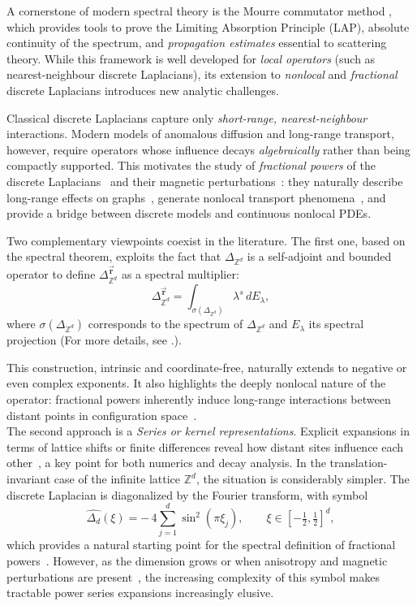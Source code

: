 \documentclass[10pt]{amsart} %
\newcommand{\1}{{\mathbb{I}}}
\numberwithin{equation}{section}
\begin{document}
A cornerstone of modern spectral theory is the Mourre commutator method \cite{GJ,GJ1,Mo81,Ge,ABG},
which provides tools to prove the Limiting Absorption Principle (LAP),
absolute continuity of the spectrum, and \emph{propagation estimates} essential to scattering theory.
While this framework is well developed for \emph{local operators}
(such as nearest-neighbour discrete Laplacians),
its extension to \emph{nonlocal} and \emph{fractional} discrete Laplacians
introduces new analytic challenges.

Classical discrete Laplacians capture only \emph{short-range, nearest-neighbour} interactions.
Modern models of anomalous diffusion and long-range transport, however,
require operators whose influence decays \emph{algebraically} rather than being compactly supported.
This motivates the study of \emph{fractional powers} of the discrete Laplacians~\cite{JKLQ,BDL,K2017,Or,Ortigueira2014Riesz} and their magnetic perturbations~\cite{Fan2021}:
they naturally describe long-range effects on graphs~\cite{TZ},
generate nonlocal transport phenomena~\cite{ScSo2012},
and provide a bridge between discrete models and continuous nonlocal PDEs.

Two complementary viewpoints coexist in the literature.
The first one, based on the spectral theorem, exploits the fact that $\Delta_{\mathbb{Z}^d}$ is a self-adjoint and bounded operator to define $\Delta^{\vec{\mathbf{r}}}_{\mathbb{Z}^d}$ as a spectral multiplier:
\[
\Delta^{\vec{\mathbf{r}}}_{\mathbb{Z}^d} = \int_{\sigma(\Delta_{\mathbb{Z}^d})} \lambda^s \, dE_\lambda,
\]
where $\sigma(\Delta_{\mathbb{Z}^d})$ corresponds to the spectrum of $\Delta_{\mathbb{Z}^d}$ and $E_\lambda$ its spectral projection (For more details, see \cite{RS,SI2015,Dav}.).

This construction, intrinsic and coordinate-free, naturally extends to negative or even complex exponents.
It also highlights the deeply nonlocal nature of the operator:
fractional powers inherently induce long-range interactions between
distant points in configuration space~\cite{ScSo2012,K2017}.
\\The second approach is a \emph{Series or kernel representations}.
    Explicit expansions in terms of lattice shifts or finite differences
    reveal how distant sites influence each other~\cite{K2017},
    a key point for both numerics and decay analysis.
\smallskip
In the translation-invariant case of the infinite lattice $\mathbb{Z}^d$, the situation is considerably simpler. The discrete Laplacian is diagonalized by the Fourier transform, with symbol
\[
\widehat{\Delta_d}(\xi) = -\,4\sum_{j=1}^d \sin^2(\pi \xi_j), \qquad \xi\in[-\tfrac12,\tfrac12]^d,
\]
which provides a natural starting point for the spectral definition of fractional powers~\cite{RS,Dav}. However, as the dimension grows or when anisotropy and magnetic perturbations are present~\cite{Fan2021,L2000}, the increasing complexity of this symbol makes tractable power series expansions increasingly elusive.
\end{document}

